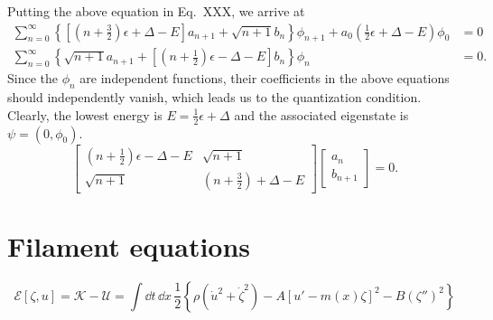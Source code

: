 %
Putting the above equation in Eq.~XXX, we arrive at
%
\begin{equation}
   \begin{aligned}
     \sum_{n = 0}^{\infty} \left\{\left[\left(n +  \tfrac{3}{2}\right)\epsilon + \Delta - E\right]a_{n + 1} + \sqrt{n + 1}b_{n}\right\}\phi_{n+1}  + a_{0}\left(\tfrac{1}{2}\epsilon + \Delta - E\right)\phi_{0}&= 0\\
     \sum_{n = 0}^{\infty} \left\{\sqrt{n + 1}a_{n+1} + \left[\left(n +  \tfrac{1}{2}\right)\epsilon - \Delta - E\right]b_{n}\right\}\phi_{n} &= 0.
   \end{aligned}
\end{equation}
%
Since the $\phi_{n}$ are independent functions, their coefficients in the above equations should independently vanish, which leads us to the quantization condition.
Clearly, the lowest energy is $E = \tfrac{1}{2}\epsilon + \Delta$ and the associated eigenstate is $\psi = (0, \phi_{0})$.
%
\begin{equation}
  \begin{bmatrix}
    \left(n + \tfrac{1}{2}\right)\epsilon - \Delta - E & \sqrt{n + 1}\\
    \sqrt{n + 1} & \left(n + \tfrac{3}{2}\right) + \Delta - E
  \end{bmatrix}
  \begin{bmatrix}
    a_{n}\\
    b_{n + 1}
  \end{bmatrix}
  = 0.
\end{equation}
%

\section{Filament equations}

%
\begin{equation}
  \mathscr{E}[\zeta, u] = \mathscr{K} - \mathscr{U} = \int \dd{t}\,\dd{x}\,\frac{1}{2}\left\{\rho\left(\dot{u}^{2} + \dot{\zeta}^{2}\right) - A\left[u' - m(x)\zeta\right]^{2} - B\left(\zeta''\right)^{2}\right\}
\end{equation}

